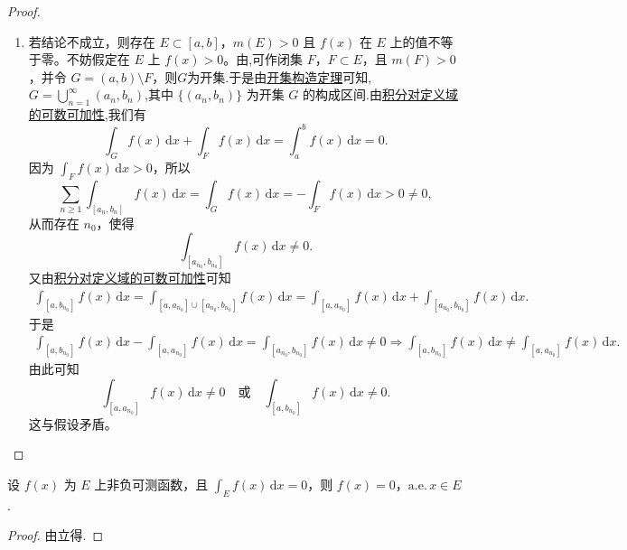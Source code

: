 \documentclass[../../main.tex]{subfiles}
\begin{document}
\begin{proof}
\begin{enumerate}[(1)]
\item 若结论不成立，则存在 $E \subset [a,b]$，$m(E) > 0$ 且 $f(x)$ 在 $E$ 上的值不等于零。不妨假定在 $E$ 上 $f(x) > 0$。由,可作闭集 $F$，$F \subset E$，且 $m(F) > 0$，并令 $G = (a,b) \setminus F$，则$G$为开集.于是由\hyperref[theorem:开集构造定理]{开集构造定理}可知,$G=\bigcup_{n=1}^{\infty}{\left( a_n,b_n \right)}$,其中 $\{ (a_n, b_n) \}$ 为开集 $G$ 的构成区间.由\hyperref[theorem:积分对定义域的可数可加性]{积分对定义域的可数可加性},我们有
\[
\int_G f(x) \, \mathrm{d}x + \int_F f(x) \, \mathrm{d}x = \int_a^b f(x) \, \mathrm{d}x = 0.
\]
因为 $\int_F f(x) \, \mathrm{d}x > 0$，所以
\[
\sum_{n \geqslant 1} \int_{[a_n, b_n]} f(x) \, \mathrm{d}x = \int_G f(x) \, \mathrm{d}x = -\int_F f(x) \, \mathrm{d}x > 0\neq 0,
\]
从而存在 $n_0$，使得
\[
\int_{[a_{n_0}, b_{n_0}]} f(x) \, \mathrm{d}x \neq 0.
\]
又由\hyperref[theorem:积分对定义域的可数可加性]{积分对定义域的可数可加性}可知
\begin{align*}
\int_{[a,b_{n_0}]}{f(x)\,\mathrm{d}x}=\int_{[a,a_{n_0}]\cup [a_{n_0},b_{n_0}]}{f(x)\,\mathrm{d}x}=\int_{[a,a_{n_0}]}{f(x)\,\mathrm{d}x}+\int_{[a_{n_0},b_{n_0}]}{f(x)\,\mathrm{d}x.}
\end{align*}
于是
\begin{align*}
\int_{[a,b_{n_0}]}{f(x)\,\mathrm{d}x}-\int_{[a,a_{n_0}]}{f(x)\,\mathrm{d}x}=\int_{[a_{n_0},b_{n_0}]}{f(x)\,\mathrm{d}x}\ne 0\Rightarrow \int_{[a,b_{n_0}]}{f(x)\,\mathrm{d}x}\ne \int_{[a,a_{n_0}]}{f(x)\,\mathrm{d}x}.
\end{align*}
由此可知
\[
\int_{[a, a_{n_0}]} f(x) \, \mathrm{d}x \neq 0 \quad \text{或} \quad \int_{[a, b_{n_0}]} f(x) \, \mathrm{d}x \neq 0.
\]
这与假设矛盾。
\end{enumerate}

\end{proof}

\begin{corollary}\label{corollary:非负可测函数积分为0则几乎处处为0}
设 \( f(x) \) 为 \( E \) 上非负可测函数，且 \( \int_E f(x)\,\mathrm{d}x = 0 \)，则 \( f(x) = 0 \)，\(\text{a.e.}\, x \in E \). 
\end{corollary}
\begin{proof}
由立得.

\end{proof}
\end{document}
